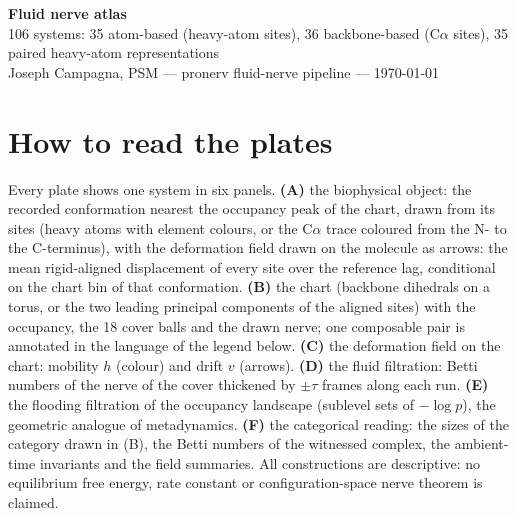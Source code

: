 \documentclass[10pt]{article}
\begin{document}
\begin{center}{\LARGE\bfseries Fluid nerve atlas}\\[4pt]
{\large 106 systems: 35 atom-based (heavy-atom sites), 36 backbone-based (C$\alpha$ sites), 35 paired heavy-atom representations}\\[3pt]
Joseph Campagna, PSM --- pronerv fluid-nerve pipeline --- \today\end{center}

\section*{How to read the plates}
Every plate shows one system in six panels. \textbf{(A)} the biophysical object: the recorded conformation nearest the occupancy
peak of the chart, drawn from its sites (heavy atoms with element colours, or the C$\alpha$ trace coloured from the N- to the C-terminus),
with the deformation field drawn on the molecule as arrows: the mean rigid-aligned displacement of every site over the reference lag,
conditional on the chart bin of that conformation. \textbf{(B)} the chart (backbone dihedrals on a torus, or the two leading principal
components of the aligned sites) with the occupancy, the 18 cover balls and the drawn nerve; one composable pair is annotated in the
language of the legend below. \textbf{(C)} the deformation field on the chart: mobility $h$ (colour) and drift $v$ (arrows).
\textbf{(D)} the fluid filtration: Betti numbers of the nerve of the cover thickened by $\pm\tau$ frames along each run.
\textbf{(E)} the flooding filtration of the occupancy landscape (sublevel sets of $-\log p$), the geometric analogue of metadynamics.
\textbf{(F)} the categorical reading: the sizes of the category drawn in (B), the Betti numbers of the witnessed complex, the
ambient-time invariants and the field summaries. All constructions are descriptive: no equilibrium free energy, rate constant or
configuration-space nerve theorem is claimed.
\end{document}
